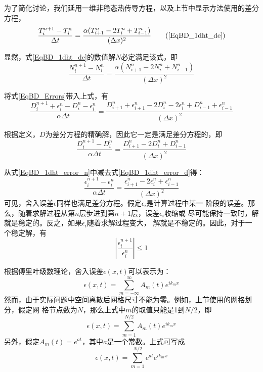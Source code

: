 为了简化讨论，我们延用一维非稳态热传导方程，以及上节中显示方法使用的差分方程，
\begin{equation}
  \frac{T_{i}^{n+1}-T_{i}^{n}}{\Delta t}
  =
  \frac{\alpha(T_{i+1}^{n}-2T_{i}^{n}+T_{i-1}^{n})}{(\Delta x)^{2}}
  \tag{\ref{EqBD_1dht_de}}
\end{equation}

显然，式\eqref{EqBD_1dht_de}的数值解$N$必定满足该式，即
\begin{equation}
  \frac{N_{i}^{n+1}-N_{i}^{n}}{\Delta t}
  =
  \frac{\alpha(N_{i+1}^{n}-2N_{i}^{n}+N_{i-1}^{n})}{(\Delta x)^{2}}
  \label{EqBD_1dht_de_N}
\end{equation}

将式\eqref{EqBD_Errors}带入上式，有
\begin{equation}
  \frac{D_{i}^{n+1}+\epsilon_{i}^{n} - D_{i}^{n} - \epsilon_{i}^{n}}{\alpha \Delta t}
  =
  \frac{D_{i+1}^{n}+\epsilon_{i+1}^{n} - 2D_{i}^{n}-2\epsilon_{i}^{n}+D_{i-1}^{n}+\epsilon_{i-1}^{n}}{(\Delta x)^{2}}
  \label{EqBD_1dht_error_n}
\end{equation}

根据定义，$D$为差分方程的精确解，因此它一定是满足差分方程的，即
\begin{equation}
  \frac{D_{i}^{n+1}-D_{i}^{n}}{\alpha\Delta t}
  =
  \frac{D_{i+1}^{n}-2D_{i}^{n}+D_{i-1}^{n}}{(\Delta x)^{2}}
  \label{EqBD_1dht_error_d}
\end{equation}

从式\eqref{EqBD_1dht_error_n}中减去式\eqref{EqBD_1dht_error_d}得：
\begin{equation}
  \frac{\epsilon_{i}^{n+1}-\epsilon_{i}^{n}}{\alpha\Delta t}
  =
  \frac{\epsilon_{i+1}^{n}-2\epsilon_{i}^{n}+\epsilon_{i-1}^{n}}{(\Delta x)^{2}}
  \label{EqBD_1dht_error_e}
\end{equation}
可见，舍入误差$\epsilon$同样也满足差分方程。假定$\epsilon_{i}$是计算过程中某一
阶段的误差。那么，随着求解过程从第$n$层步进到第$n+1$层，误差$\epsilon_{i}$收缩或
尽可能保持一致时，解就是稳定的。反之，如果$\epsilon_{i}$随着求解过程变大，
解就是不稳定的。因此，对于一个稳定解，有
\begin{equation}
\left|
\frac{\epsilon_{i}^{n+1}}{\epsilon_{i}^{n}}
\right|
\le
1
\label{EqBD_Stability}
\end{equation}


根据傅里叶级数理论，舍入误差$\epsilon(x,t)$可以表示为：
\begin{equation}
  \epsilon(x,t) = \sum_{m=-\infty}^{\infty}A_{m}(t)e^{ik_{m}x}
\end{equation}
然而，由于实际问题中空间离散后网格尺寸不能为零。例如，上节使用的网格划分，假定网
格节点数为$N$，那么上式中$m$的取值只能是1到$N/2$，即
\begin{equation}
  \epsilon(x,t) = \sum_{m=1}^{N/2}A_{m}(t)e^{ik_{m}x}
\end{equation}
另外，假定$A_{m}(t)=e^{at}$，其中$a$是一个常数。上式可写成
\begin{equation}
  \epsilon(x,t) = \sum_{m=1}^{N/2}e^{at}e^{ik_{m}x}
  \label{EqBD_errors_expression}
\end{equation}

